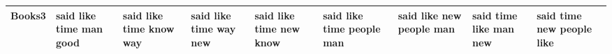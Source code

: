 \documentclass[11pt,a4paper]{article}
\begin{document}
\begin{appendices}
\begin{table*}[htb]
\begin{tiny}
\begin{tabular}{|p{}|p{}|p{}|p{}|p{}|p{}|p{}|p{}|p{}|}
    Books3 & said \newline like \newline time \newline man \newline good & said \newline like \newline time \newline know \newline way & said \newline like \newline time \newline way \newline new & said \newline like \newline time \newline new \newline know & said \newline like \newline time \newline people \newline man & said \newline like \newline new \newline people \newline man & said \newline time \newline like \newline man \newline new & said \newline time \newline new \newline people \newline like\\\hline

\end{tabular}
\end{tiny}
\end{table*}
\end{appendices}
\end{document}
